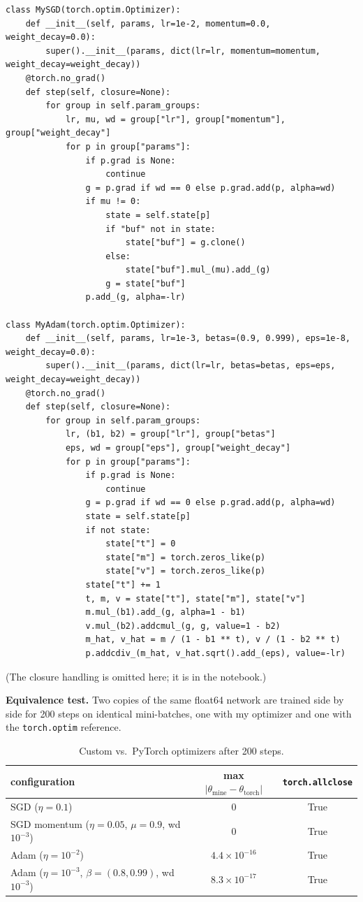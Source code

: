 \documentclass[11pt,a4paper]{article}
\begin{document}
\begin{lstlisting}
class MySGD(torch.optim.Optimizer):
    def __init__(self, params, lr=1e-2, momentum=0.0, weight_decay=0.0):
        super().__init__(params, dict(lr=lr, momentum=momentum, weight_decay=weight_decay))
    @torch.no_grad()
    def step(self, closure=None):
        for group in self.param_groups:
            lr, mu, wd = group["lr"], group["momentum"], group["weight_decay"]
            for p in group["params"]:
                if p.grad is None:
                    continue
                g = p.grad if wd == 0 else p.grad.add(p, alpha=wd)
                if mu != 0:
                    state = self.state[p]
                    if "buf" not in state:
                        state["buf"] = g.clone()
                    else:
                        state["buf"].mul_(mu).add_(g)
                    g = state["buf"]
                p.add_(g, alpha=-lr)

class MyAdam(torch.optim.Optimizer):
    def __init__(self, params, lr=1e-3, betas=(0.9, 0.999), eps=1e-8, weight_decay=0.0):
        super().__init__(params, dict(lr=lr, betas=betas, eps=eps, weight_decay=weight_decay))
    @torch.no_grad()
    def step(self, closure=None):
        for group in self.param_groups:
            lr, (b1, b2) = group["lr"], group["betas"]
            eps, wd = group["eps"], group["weight_decay"]
            for p in group["params"]:
                if p.grad is None:
                    continue
                g = p.grad if wd == 0 else p.grad.add(p, alpha=wd)
                state = self.state[p]
                if not state:
                    state["t"] = 0
                    state["m"] = torch.zeros_like(p)
                    state["v"] = torch.zeros_like(p)
                state["t"] += 1
                t, m, v = state["t"], state["m"], state["v"]
                m.mul_(b1).add_(g, alpha=1 - b1)
                v.mul_(b2).addcmul_(g, g, value=1 - b2)
                m_hat, v_hat = m / (1 - b1 ** t), v / (1 - b2 ** t)
                p.addcdiv_(m_hat, v_hat.sqrt().add_(eps), value=-lr)
\end{lstlisting}
(The closure handling is omitted here; it is in the notebook.)

\textbf{Equivalence test.} Two copies of the same float64 network are trained side by side for 200 steps on identical mini-batches, one with my optimizer and one with the \texttt{torch.optim} reference.

\begin{table}[H]
\centering
\caption{Custom vs.\ PyTorch optimizers after 200 steps.}
\begin{tabular}{lcc}
\toprule
configuration & max $|\theta_\text{mine}-\theta_\text{torch}|$ & \texttt{torch.allclose}\\
\midrule
SGD ($\eta=0.1$) & 0 & True\\
SGD momentum ($\eta=0.05$, $\mu=0.9$, wd $10^{-3}$) & 0 & True\\
Adam ($\eta=10^{-2}$) & $4.4\times10^{-16}$ & True\\
Adam ($\eta=10^{-3}$, $\beta=(0.8,0.99)$, wd $10^{-3}$) & $8.3\times10^{-17}$ & True\\
\bottomrule
\end{tabular}
\end{table}
\end{document}
